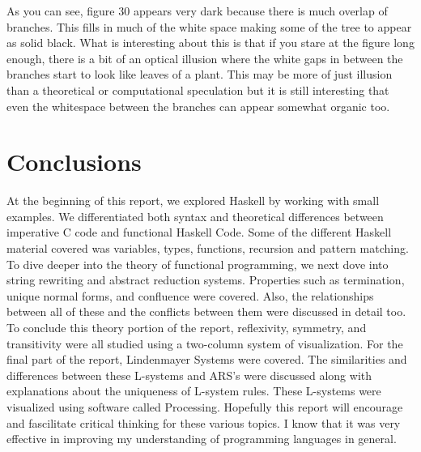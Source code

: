\documentclass{article}
\begin{document}
\medskip\noindent
As you can see, figure 30 appears very dark because there is much overlap of branches. This fills in much of the white space making some of the tree to appear as solid black. What is interesting about this is that if you stare at the figure long enough, there is a bit of an optical illusion where the white gaps in between the branches start to look like leaves of a plant. This may be more of just illusion than a theoretical or computational speculation but it is still interesting that even the whitespace between the branches can appear somewhat organic too.

\section{Conclusions}\label{conclusions}
At the beginning of this report, we explored Haskell by working with small examples. We differentiated both syntax and theoretical differences between imperative C code and functional Haskell Code. Some of the different Haskell material covered was variables, types, functions, recursion and pattern matching. To dive deeper into the theory of functional programming, we next dove into string rewriting and abstract reduction systems. Properties such as termination, unique normal forms, and confluence were covered. Also, the relationships between all of these and the conflicts between them were discussed in detail too. To conclude this theory portion of the report, reflexivity, symmetry, and transitivity were all studied using a two-column system of visualization. For the final part of the report, Lindenmayer Systems were covered. The similarities and differences between these L-systems and ARS's were discussed along with explanations about the uniqueness of L-system rules. These L-systems were visualized using software called Processing. Hopefully this report will encourage and fascilitate critical thinking for these various topics. I know that it was very effective in improving my understanding of programming languages in general.
\end{document}
